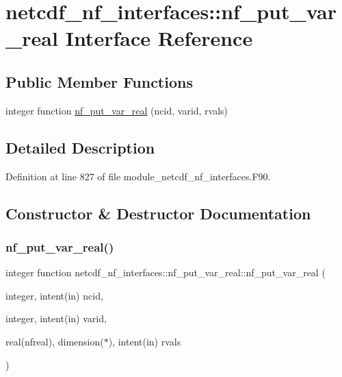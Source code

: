 \hypertarget{interfacenetcdf__nf__interfaces_1_1nf__put__var__real}{}\section{netcdf\+\_\+nf\+\_\+interfaces\+:\+:nf\+\_\+put\+\_\+var\+\_\+real Interface Reference}
\label{interfacenetcdf__nf__interfaces_1_1nf__put__var__real}
\subsection*{Public Member Functions}
\begin{DoxyCompactItemize}
\item 
integer function \hyperlink{interfacenetcdf__nf__interfaces_1_1nf__put__var__real_a0ba200daf29e11bdbd84dac3db0fe011}{nf\+\_\+put\+\_\+var\+\_\+real} (ncid, varid, rvals)
\end{DoxyCompactItemize}


\subsection{Detailed Description}


Definition at line 827 of file module\+\_\+netcdf\+\_\+nf\+\_\+interfaces.\+F90.



\subsection{Constructor \& Destructor Documentation}
\mbox{\label{interfacenetcdf__nf__interfaces_1_1nf__put__var__real_a0ba200daf29e11bdbd84dac3db0fe011}} 
\subsubsection{\texorpdfstring{nf\+\_\+put\+\_\+var\+\_\+real()}{nf\_put\_var\_real()}}
{\footnotesize\ttfamily integer function netcdf\+\_\+nf\+\_\+interfaces\+::nf\+\_\+put\+\_\+var\+\_\+real\+::nf\+\_\+put\+\_\+var\+\_\+real (\begin{DoxyParamCaption}\item[{integer, intent(in)}]{ncid,  }\item[{integer, intent(in)}]{varid,  }\item[{real(nfreal), dimension($\ast$), intent(in)}]{rvals }\end{DoxyParamCaption})}




